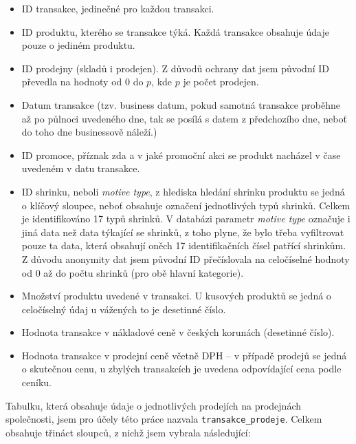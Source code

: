 \begin{itemize}
    \item ID transakce, jedinečné pro každou transakci.
    \item ID produktu, kterého se transakce týká. Každá transakce obsahuje údaje pouze o jediném produktu. 
    \item ID prodejny (skladů i prodejen). Z důvodů ochrany dat jsem původní ID převedla na hodnoty od 0 do $p$, kde $p$ je počet prodejen.
    \item Datum transakce (tzv. business datum, pokud samotná transakce proběhne až po půlnoci uvedeného dne, tak se posílá s datem z předchozího dne, neboť do toho dne businessově náleží.)
    \item ID promoce, příznak zda a v jaké promoční akci se produkt nacházel v čase uvedeném v datu transakce.
    \item ID shrinku, neboli \emph{motive type}, z hlediska hledání shrinku produktu se jedná o klíčový sloupec, neboť obsahuje označení jednotlivých typů shrinků. Celkem je identifikováno 17 typů shrinků. V databázi parametr \emph{motive type} označuje i jiná data než data týkající se shrinků, z toho plyne, že bylo třeba vyfiltrovat pouze ta data, která obsahují oněch 17 identifikačních čísel patřící shrinkům. Z důvodu anonymity dat jsem původní ID přečíslovala na celočíselné hodnoty od 0 až do počtu shrinků (pro obě hlavní kategorie).
    \item Množství produktu uvedené v transakci. U kusových produktů se jedná o celočíselný údaj u vážených to je desetinné číslo.
    \item Hodnota transakce v nákladové ceně v českých korunách (desetinné číslo).
    \item Hodnota transakce v prodejní ceně včetně DPH -- v případě prodejů se jedná o skutečnou cenu, u zbylých transakcích je uvedena odpovídající cena podle ceníku.
\end{itemize}

Tabulku, která obsahuje údaje o jednotlivých prodejích na prodejnách společnosti, jsem pro účely této práce nazvala \texttt{transakce\_prodeje}. Celkem obsahuje třináct sloupců, z nichž jsem vybrala následující:


